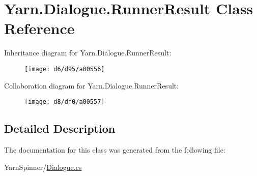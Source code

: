 \hypertarget{a00132}{\section{Yarn.\-Dialogue.\-Runner\-Result Class Reference}
\label{a00132}
}


Inheritance diagram for Yarn.\-Dialogue.\-Runner\-Result\-:
\nopagebreak
\begin{figure}[H]
\begin{center}
\leavevmode
\texttt{[image: d6/d95/a00556]}
\end{center}
\end{figure}


Collaboration diagram for Yarn.\-Dialogue.\-Runner\-Result\-:
\nopagebreak
\begin{figure}[H]
\begin{center}
\leavevmode
\texttt{[image: d8/df0/a00557]}
\end{center}
\end{figure}


\subsection{Detailed Description}


The documentation for this class was generated from the following file\-:\begin{DoxyCompactItemize}
\item 
Yarn\-Spinner/\hyperlink{a00265}{Dialogue.\-cs}\end{DoxyCompactItemize}
